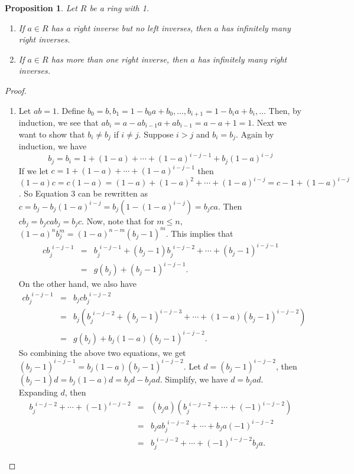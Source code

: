 \documentclass[12pt]{article}
\newtheorem{prop}{Proposition}
\newcommand{\pwr}[3]{{#1}_{#2}^{\phantom{#2}#3}}
\begin{document}
\begin{prop} Let $R$ be a ring with 1.
\begin{enumerate}
\item
If $a\in R$ has a right inverse but no left inverses, then $a$ has infinitely many right inverses.
\item
If $a\in R$ has more than one right inverse, then $a$ has infinitely many right inverses.
\end{enumerate}
\end{prop}

\begin{proof}
$$$$
\begin{enumerate}
\item
Let $ab=1$.  Define $b_0=b, b_1=1-b_0a+b_0, \dots, b_{i+1}=1-b_ia+b_i, \ldots$ Then, by induction, we see that
$ab_i = a-ab_{i-1}a+ab_{i-1}=a-a+1=1$.  Next we want to show that $b_i\neq b_j$ if $i\neq j$.  Suppose $i>j$ and
$b_i=b_j$.  Again by induction, we have
\begin{equation}
b_j=b_i=1+(1-a)+\cdots+(1-a)^{i-j-1}+b_j(1-a)^{i-j}
\end{equation}
If we let $c=1+(1-a)+\cdots+(1-a)^{i-j-1}$ then $(1-a)c=c(1-a)=(1-a)+(1-a)^2+\cdots+(1-a)^{i-j}=c-1+(1-a)^{i-j}$.
So Equation 3 can be rewritten as $c=b_j-b_j(1-a)^{i-j}=b_j(1-(1-a)^{i-j})=b_jca$.  Then $cb_j=b_jcab_j=b_jc$.
Now, note that for $m\leq n$, $(1-a)^nb_j^m = (1-a)^{n-m}(b_j-1)^m$. This implies that
\begin{eqnarray*}
c\pwr{b}{j}{i-j-1} &=& \pwr{b}{j}{i-j-1}+(b_j-1)\pwr{b}{j}{i-j-2}+\cdots+(b_j-1)^{i-j-1} \\ &=& g(b_j)+(b_j-1)^{i-j-1}.
\end{eqnarray*}
On the other hand, we also have
\begin{eqnarray*}
c\pwr{b}{j}{i-j-1} &=& b_jc\pwr{b}{j}{i-j-2} \\ &=& b_j(\pwr{b}{j}{i-j-2}+(b_j-1)^{i-j-3}+
\cdots+(1-a)(b_j-1)^{i-j-2}) \\ &=& g(b_j)+b_j(1-a)(b_j-1)^{i-j-2}.
\end{eqnarray*}
So combining the above two equations, we get $(b_j-1)^{i-j-1}=b_j(1-a)(b_j-1)^{i-j-2}$.  Let $d=
(b_j-1)^{i-j-2}$, then $(b_j-1)d=b_j(1-a)d=b_jd-b_jad$.  Simplify, we have $d=b_jad$.  Expanding $d$, then
\begin{eqnarray*}
\pwr{b}{j}{i-j-2}+\cdots+(-1)^{i-j-2} &=& (b_ja)(\pwr{b}{j}{i-j-2}+\cdots+(-1)^{i-j-2}) \\
&=& b_ja\pwr{b}{j}{i-j-2}+\cdots+b_ja(-1)^{i-j-2} \\ &=& \pwr{b}{j}{i-j-2}+\cdots+(-1)^{i-j-2}b_ja.

\end{eqnarray*}
\end{enumerate}
\end{proof}
\end{document}
